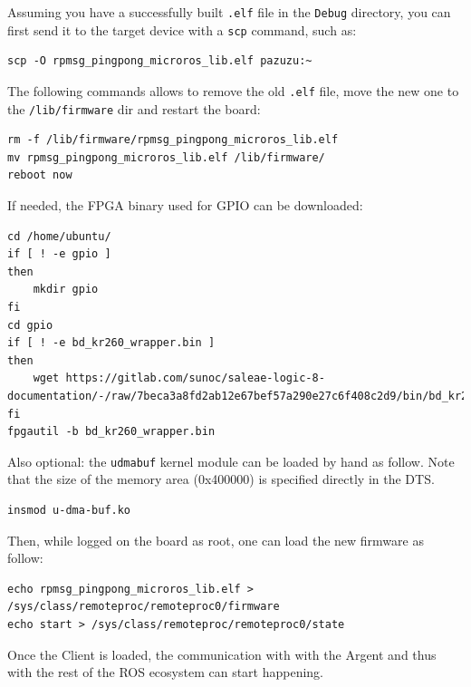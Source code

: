 \documentclass[10pt]{article}
\begin{document}
Assuming you have a successfully built \texttt{.elf} file in the \texttt{Debug} directory, you can
first send it to the target device with a \texttt{scp} command, such as:
\begin{verbatim}
scp -O rpmsg_pingpong_microros_lib.elf pazuzu:~
\end{verbatim}

The following commands allows to remove the old \texttt{.elf} file, move the new one to
the \texttt{/lib/firmware} dir and restart the board:
\begin{verbatim}
rm -f /lib/firmware/rpmsg_pingpong_microros_lib.elf
mv rpmsg_pingpong_microros_lib.elf /lib/firmware/
reboot now
\end{verbatim}

If needed, the FPGA binary used for GPIO can be downloaded:
\begin{verbatim}
cd /home/ubuntu/
if [ ! -e gpio ]
then
    mkdir gpio
fi
cd gpio
if [ ! -e bd_kr260_wrapper.bin ]
then
    wget https://gitlab.com/sunoc/saleae-logic-8-documentation/-/raw/7beca3a8fd2ab12e67bef57a290e27c6f408c2d9/bin/bd_kr260_wrapper.bin
fi
fpgautil -b bd_kr260_wrapper.bin
\end{verbatim}

Also optional: the \texttt{udmabuf} kernel module can be loaded by hand as follow.
Note that the size of the memory area (0x400000) is specified directly in the DTS.
\begin{verbatim}
insmod u-dma-buf.ko
\end{verbatim}

Then, while logged on the board as root, one can load the new firmware as
follow:
\begin{verbatim}
echo rpmsg_pingpong_microros_lib.elf > /sys/class/remoteproc/remoteproc0/firmware
echo start > /sys/class/remoteproc/remoteproc0/state
\end{verbatim}

Once the Client is loaded, the communication with with the Argent and thus with
the rest of the ROS ecosystem can start happening.
\end{document}
